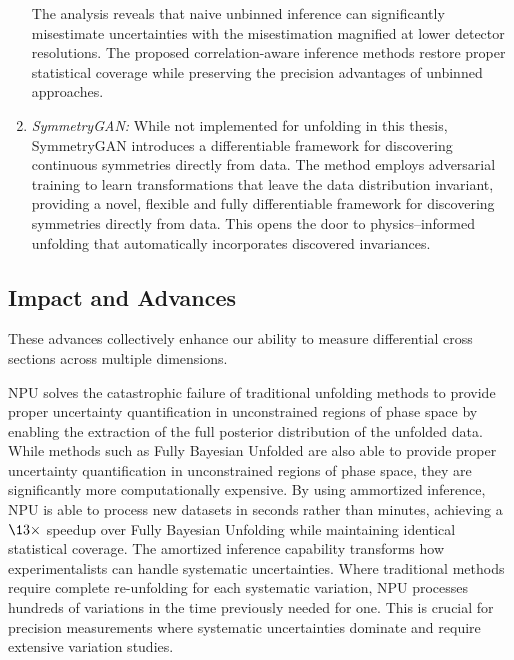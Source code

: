 \begin{enumerate}
            The analysis reveals that naive unbinned inference can significantly misestimate uncertainties with the misestimation magnified at lower detector resolutions.
            The proposed correlation-aware inference methods restore proper statistical coverage while preserving the precision advantages of unbinned approaches.
            \item \emph{SymmetryGAN:} While not implemented for unfolding in this thesis, SymmetryGAN introduces a differentiable framework for discovering continuous symmetries directly from data.
            The method employs adversarial training to learn transformations that leave the data distribution invariant, providing a novel, flexible and fully differentiable framework for discovering symmetries directly from data.
            This opens the door to physics--informed unfolding that automatically incorporates discovered invariances.
        \end{enumerate}
    \subsection{Impact and Advances}
        These advances collectively enhance our ability to measure differential cross sections across multiple dimensions.
        
        NPU solves the catastrophic failure of traditional unfolding methods to provide proper uncertainty quantification in unconstrained regions of phase space by enabling the extraction of the full posterior distribution of the unfolded data.
        While methods such as Fully Bayesian Unfolded are also able to provide proper uncertainty quantification in unconstrained regions of phase space, they are significantly more computationally expensive.
        By using ammortized inference, NPU is able to process new datasets in seconds rather than minutes, achieving a \(\13\times\) speedup over Fully Bayesian Unfolding while maintaining identical statistical coverage.
        The amortized inference capability transforms how experimentalists can handle systematic uncertainties.
        Where traditional methods require complete re-unfolding for each systematic variation, NPU processes hundreds of variations in the time previously needed for one.
        This is crucial for precision measurements where systematic uncertainties dominate and require extensive variation studies.

